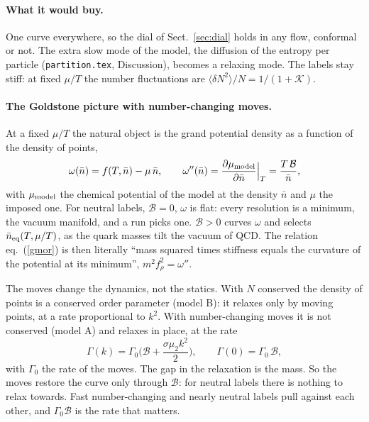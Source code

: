 \documentclass[11pt,aps,preprint,nofootinbib,superscriptaddress,tightenlines]{revtex4-2}
\newcommand{\avg}[1]{\langle #1\rangle}
\def\st{\begin{equation}}
\def\stp{\end{equation}}
\def\Eq#1{eq.~(\ref{#1})}
\def\Sect#1{Sect.~\ref{#1}}
\let\oldparagraph\paragraph
\renewcommand{\paragraph}{\par\bigskip\oldparagraph}
\begin{document}
\paragraph{What it would buy.}  One curve everywhere, so the dial of \Sect{sec:dial} holds in any flow, conformal or not.  The extra slow mode of the model, the
diffusion of the entropy per particle (\texttt{partition.tex}, Discussion), becomes a relaxing mode.  The labels stay stiff: at fixed $\mu/T$ the number fluctuations are
$\avg{\delta N^2}/N=1/(1+\mathcal K)$.

\paragraph{The Goldstone picture with number-changing moves.}  At a fixed $\mu/T$ the natural object is the grand potential density as a function of the
density of points,
\st
\omega(\bar n)=f(T,\bar n)-\mu\,\bar n,\qquad \omega''(\bar n)=\frac{\partial\mu_{\rm model}}{\partial\bar n}\Big|_T=\frac{T\,\mathcal B}{\bar n},
\stp
with $\mu_{\rm model}$ the chemical potential of the model at the density $\bar n$ and $\mu$ the imposed one.  For neutral labels, $\mathcal B=0$, $\omega$ is
flat: every resolution is a minimum, the vacuum manifold, and a run picks one.  $\mathcal B>0$ curves $\omega$ and selects $\bar n_{\rm eq}(T,\mu/T)$, as the
quark masses tilt the vacuum of QCD.  The relation \Eq{gmor} is then literally ``mass squared times stiffness equals the curvature of the potential at its minimum'',
$m^2f_\rho^2=\omega''$.

The moves change the dynamics, not the statics.  With $N$ conserved the density of points is a conserved order parameter (model B): it relaxes only by moving
points, at a rate proportional to $k^2$.  With number-changing moves it is not conserved (model A) and relaxes in place, at the rate
\st
\Gamma(k)=\Gamma_0\Big(\mathcal B+\frac{\sigma\mu_2k^2}2\Big),\qquad \Gamma(0)=\Gamma_0\,\mathcal B,
\stp
with $\Gamma_0$ the rate of the moves.  The gap in the relaxation is the mass.  So the moves restore the curve only through $\mathcal B$: for neutral labels
there is nothing to relax towards.  Fast number-changing and nearly neutral labels pull against each other, and $\Gamma_0\mathcal B$ is the rate that
matters.
\end{document}
